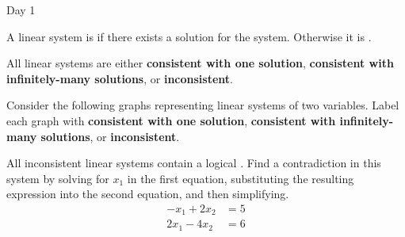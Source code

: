 \begin{applicationActivities}{Day 1}
\begin{definition}
  A linear system is  if there exists a solution for the
  system. Otherwise it is .
\end{definition}

\begin{fact}
  All linear systems are either \textbf{consistent with one solution},
  \textbf{consistent with infinitely-many solutions}, or
  \textbf{inconsistent}.
\end{fact}

\begin{activity}{0}
  Consider the following graphs representing linear systems of two variables.
  Label each graph with \textbf{consistent with one solution},
  \textbf{consistent with infinitely-many solutions}, or
  \textbf{inconsistent}.
  \begin{multicols}{4}
  \begin{center}
    \systemWithInfinitelyManySolutions
    \systemWithOneSolutionB
    \systemWithNoSolutions
    \systemWithOneSolutionA
  \end{center}
  \end{multicols}
\end{activity}

\begin{activity}{0}
  All inconsistent linear systems contain a logical .
  Find a contradiction in this system by solving for \(x_1\) in the first
  equation, substituting the resulting expression into the
  second equation, and then simplifying.
  \begin{align*}
  -x_1+2x_2  &=  5 \\
  2x_1-4x_2  &=  6
  \end{align*}
\end{activity}


\end{applicationActivities}
